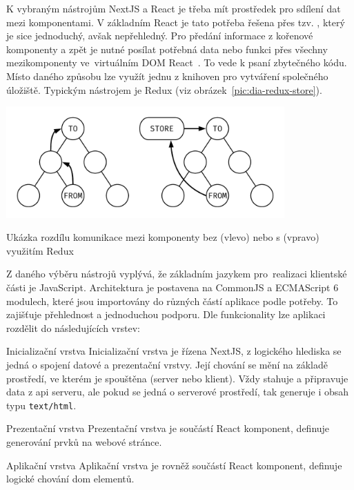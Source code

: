 K vybraným nástrojům NextJS a React je třeba mít prostředek pro sdílení dat mezi komponentami. V základním React je tato potřeba řešena přes tzv. , který je sice jednoduchý, avšak nepřehledný. Pro předání informace z kořenové komponenty a zpět je nutné posílat potřebná data nebo funkci přes všechny mezikomponenty ve~virtuálním DOM React~\cite{reactLifting}. To vede k psaní zbytečného kódu. Místo daného způsobu lze využít jednu z knihoven pro vytváření společného úložiště. Typickým nástrojem je Redux (viz obrázek~\ref{pic:dia-redux-store}).

\begin{fig:illustration}
   \includegraphics[width=0.8\textwidth]{images/dia-redux-store.pdf}
   \caption[Ukázka rozdílu komunikace mezi komponenty]{Ukázka rozdílu komunikace mezi komponenty bez (vlevo) nebo s (vpravo) využitím Redux}\label{pic:dia-redux-store}
\end{fig:illustration}


Z daného výběru nástrojů vyplývá, že základním jazykem pro~realizaci klientské části je JavaScript. Architektura je postavena na CommonJS a ECMAScript 6 modulech, které jsou importovány do různých částí aplikace podle potřeby. To zajišťuje přehlednost a jednoduchou podporu. Dle funkcionality lze aplikaci rozdělit do následujících vrstev:

\begin{dl}
   \item [Inicializační vrstva] Inicializační vrstva je řízena NextJS, z logického hlediska se jedná o spojení datové a prezentační vrstvy. Její chování se mění na základě prostředí, ve kterém je spouštěna (server nebo klient). Vždy stahuje a připravuje data z \gls{api} serveru, ale pokud se jedná o serverové prostředí, tak generuje i obsah typu \texttt{text/html}.
   
   \item [Prezentační vrstva] Prezentační vrstva je součástí React komponent, definuje generování prvků na webové stránce. 
   
   \item [Aplikační vrstva] Aplikační vrstva je rovněž součástí React komponent, definuje logické chování \gls{dom} elementů.
\end{dl}


